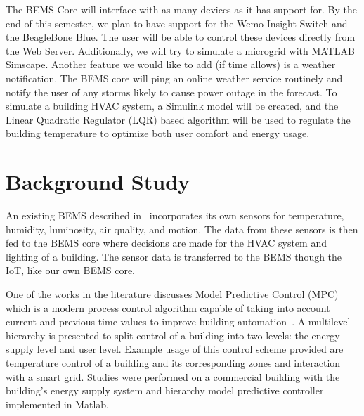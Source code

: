 \documentclass[letterpaper,12pt]{article}   %
\begin{document}
The BEMS Core will interface with as many devices as it has support for. By the end of this semester, we plan to have support for the Wemo Insight Switch and the BeagleBone Blue. The user will be able to control these devices directly from the Web Server. Additionally, we will try to simulate a microgrid with MATLAB Simscape. Another feature we would like to add (if time allows) is a weather notification. The BEMS core will ping an online weather service routinely and notify the user of any storms likely to cause power outage in the forecast. To simulate a building HVAC system, a Simulink model will be created, and the Linear Quadratic Regulator (LQR) based algorithm will be used to regulate the building temperature to optimize both user comfort and energy usage.

\section{Background Study} %
An existing BEMS described in~\cite{Mataloto2019} incorporates its own sensors for temperature, humidity, luminosity, air quality, and motion. The data from these sensors is then fed to the BEMS core where decisions are made for the HVAC system and lighting of a building. The sensor data is transferred to the BEMS though the IoT, like our own BEMS core. 

One of the works in the literature discusses Model Predictive Control (MPC) which is a modern process control algorithm capable of taking into account current and previous time values to improve building automation~\cite{Mayer2017}. A multilevel hierarchy is presented to split control of a building into two levels: the energy supply level and user level. Example usage of this control scheme provided are temperature control of a building and its corresponding zones and interaction with a smart grid. Studies were performed on a commercial building with the building's energy supply system and hierarchy model predictive controller implemented in Matlab.
\end{document}
